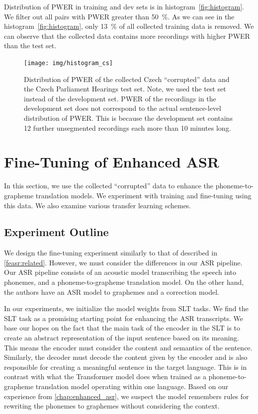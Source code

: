 Distribution of PWER in training and dev sets is in histogram~\ref{fig:histogram}. We filter out all pairs with PWER greater than 50~\%. As we can see in the histogram~\ref{fig:histogram}, only 13~\% of all collected training data is removed. We can observe that the collected data contains more recordings with higher PWER than the test set. 

\begin{figure}[t]
	\texttt{[image: img/histogram\_cs]}
	\caption[PWER distribution of collected Czech data]{Distribution of PWER of the collected Czech ``corrupted'' data and the Czech Parliament Hearings test set. Note, we used the test set instead of the development set. PWER of the recordings in the development set does not correspond to the actual sentence-level distribution of PWER. This is because the development set contains 12  further unsegmented recordings each more than 10 minutes long.}
	\label{fig:histogram_cs}
\end{figure}






\section{Fine-Tuning of Enhanced ASR}
\label{feasr:feasr}
In this section, we use the collected ``corrupted'' data to enhance the phoneme-to-grapheme translation models. We experiment with training and fine-tuning using this data. We also examine various transfer learning schemes.

\subsection{Experiment Outline}
We design the fine-tuning experiment similarly to that of  described in \cref{feasr:related}. However, we must consider the differences in our ASR pipeline. Our ASR pipeline consists of an acoustic model transcribing the speech into phonemes, and a phoneme-to-grapheme translation model. On the other hand, the authors have an ASR model to graphemes and a correction model.

In our experiments, we initialize the model weights from SLT tasks. We find the SLT task as a promising starting point for enhancing the ASR transcripts. We base our hopes on the fact that the main task of the encoder in the SLT is to create an abstract representation of the input sentence based on its meaning. This means the encoder must consider the content and semantics of the sentence. Similarly, the decoder must decode the content given by the encoder and is also responsible for creating a meaningful sentence in the target language. This is in contrast with what the Transformer model does when trained as a phoneme-to-grapheme translation model operating within one language. Based on our experience from \cref{chap:enhanced_asr}, we suspect the model remembers rules for rewriting the phonemes to graphemes without considering the context. 

